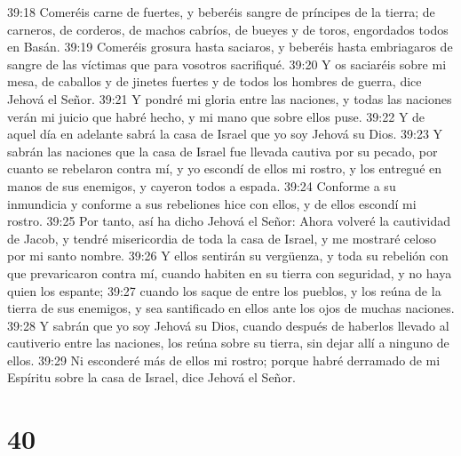 39:18 Comeréis carne de fuertes, y beberéis sangre de príncipes de la tierra; de carneros, de corderos, de machos cabríos, de bueyes y de toros, engordados todos en Basán.  
39:19 Comeréis grosura hasta saciaros, y beberéis hasta embriagaros de sangre de las víctimas que para vosotros sacrifiqué.  
39:20 Y os saciaréis sobre mi mesa, de caballos y de jinetes fuertes y de todos los hombres de guerra, dice Jehová el Señor. 
39:21 Y pondré mi gloria entre las naciones, y todas las naciones verán mi juicio que habré hecho, y mi mano que sobre ellos puse.  
39:22 Y de aquel día en adelante sabrá la casa de Israel que yo soy Jehová su Dios.  
39:23 Y sabrán las naciones que la casa de Israel fue llevada cautiva por su pecado, por cuanto se rebelaron contra mí, y yo escondí de ellos mi rostro, y los entregué en manos de sus enemigos, y cayeron todos a espada.  
39:24 Conforme a su inmundicia y conforme a sus rebeliones hice con ellos, y de ellos escondí mi rostro.  
39:25 Por tanto, así ha dicho Jehová el Señor: Ahora volveré la cautividad de Jacob, y tendré misericordia de toda la casa de Israel, y me mostraré celoso por mi santo nombre.  
39:26 Y ellos sentirán su vergüenza, y toda su rebelión con que prevaricaron contra mí, cuando habiten en su tierra con seguridad, y no haya quien los espante;  
39:27 cuando los saque de entre los pueblos, y los reúna de la tierra de sus enemigos, y sea santificado en ellos ante los ojos de muchas naciones.  
39:28 Y sabrán que yo soy Jehová su Dios, cuando después de haberlos llevado al cautiverio entre las naciones, los reúna sobre su tierra, sin dejar allí a ninguno de ellos.  
39:29 Ni esconderé más de ellos mi rostro; porque habré derramado de mi Espíritu sobre la casa de Israel, dice Jehová el Señor.  

\chapter{40}

